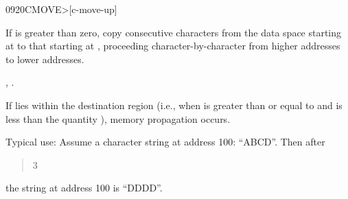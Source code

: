 \begin{worddef}[CMOVEtop]{0920}{CMOVE>}[c-move-up]
\item {}

	If  is greater than zero, copy  consecutive
	characters from the data space starting at  to
	that starting at , proceeding character-by-character
	from higher addresses to lower addresses.

\see {}, .

	\begin{rationale} %
		If  lies within the destination region (i.e.,
		when  is greater than or equal to
		 and  is less than the
		quantity  
		\word[core]{+}), memory propagation	occurs.

		Typical use: Assume a character string at address
		100: ``ABCD''. Then after
		\begin{quote}   
			3 
		\end{quote}
		the string at address 100 is ``DDDD''.
	\end{rationale}
\end{worddef}


